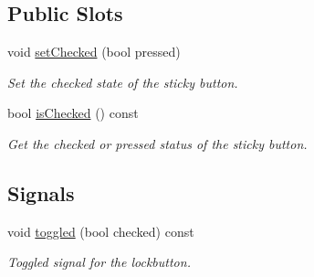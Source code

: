 \subsection*{Public Slots}
\begin{DoxyCompactItemize}
\item 
void \hyperlink{class_q_sticky_button_a694a4a05275faf028d6e29e2a10fe059}{set\-Checked} (bool pressed)
\begin{DoxyCompactList}\small\item\em Set the checked state of the sticky button. \end{DoxyCompactList}\item 
bool \hyperlink{class_q_sticky_button_a33b2e4842a6c2ddd55e0c9f5425942ba}{is\-Checked} () const 
\begin{DoxyCompactList}\small\item\em Get the checked or pressed status of the sticky button. \end{DoxyCompactList}\end{DoxyCompactItemize}
\subsection*{Signals}
\begin{DoxyCompactItemize}
\item 
void \hyperlink{class_q_sticky_button_ab47e7e8f739b82d34cceb4f5f2ccb101}{toggled} (bool checked) const 
\begin{DoxyCompactList}\small\item\em Toggled signal for the lockbutton. \end{DoxyCompactList}\end{DoxyCompactItemize}
